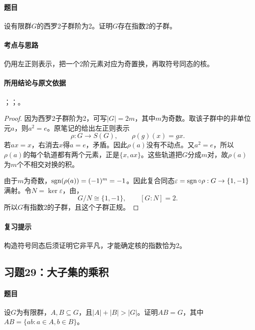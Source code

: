 \paragraph{题目}
设有限群$G$的西罗2子群阶为2。证明$G$存在指数2的子群。

\paragraph{考点与思路}
仍用左正则表示，把一个2阶元素对应为奇置换，再取符号同态的核。

\paragraph{所用结论与原文依据}
；；。


\begin{proof}
因为西罗2子群阶为2，可写$|G|=2m$，其中$m$为奇数。取该子群中的非单位元$a$，则$a^2=e$。原笔记的给出左正则表示
\[
\rho:G\longrightarrow S(G),\qquad \rho(g)(x)=gx.
\]
若$ax=x$，右消去$x$得$a=e$，矛盾。因此$\rho(a)$没有不动点。又$a^2=e$，所以$\rho(a)$的每个轨道都有两个元素，正是$\{x,ax\}$。这些轨道把$G$分成$m$对，故$\rho(a)$为$m$个不相交对换的积。

由于$m$为奇数，$\operatorname{sgn}(\rho(a))=(-1)^m=-1$。因此复合同态$\varepsilon=\operatorname{sgn}\circ\rho:G\to\{1,-1\}$满射。令$N=\ker\varepsilon$，由，
\[
G/N\cong\{1,-1\},\qquad [G:N]=2.
\]
所以$G$有指数2的子群，且这个子群正规。
\end{proof}

\paragraph{复习提示}
构造符号同态后须证明它非平凡，才能确定核的指数恰为2。


\subsection{习题29：\texorpdfstring{大子集的乘积}{大子集的乘积}}
\label{ex:2:29}

\paragraph{题目}
设$G$为有限群，$A,B\subseteq G$，且$|A|+|B|>|G|$。证明$AB=G$，其中$AB=\{ab:a\in A,b\in B\}$。

